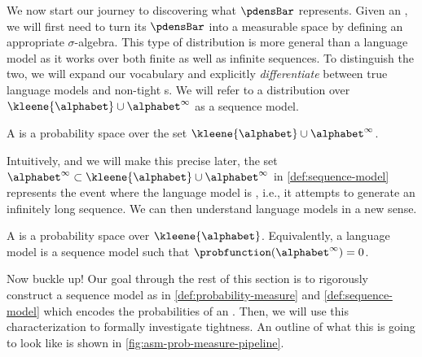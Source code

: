 We now start our journey to discovering what $\pdensBar$ represents.
Given an \autoregmodelAcronym, we will first need to turn its $\pdensBar$ into a measurable space by defining an appropriate $\sigma$-algebra.  
This type of distribution is more general than a language model as it works over both finite as well as infinite sequences.
To distinguish the two, we will expand our vocabulary and explicitly \emph{differentiate} between true language models and non-tight \autoregmodelAcronym{}s.
We will refer to a distribution over $\kleene{\alphabet} \cup \alphabet^\infty$ as a sequence model.  
\begin{definition}
\label{def:sequence-model}
A  is a probability space over the set $\kleene{\alphabet} \cup \alphabet^\infty$.
\end{definition}
Intuitively, and we will make this precise later, the set $\alphabet^\infty\subset\kleene{\alphabet} \cup \alphabet^\infty$ in \cref{def:sequence-model} represents the event where the language model is , i.e., it attempts to generate an infinitely long sequence. 
We can then understand language models in a new sense.
\begin{definition}
\label{def:language-model-eqivalent}
A  is a probability space over $\kleene{\alphabet}$.
Equivalently, a language model is a sequence model such that $\probfunction(\alphabet^\infty)=0$.
\end{definition}
Now buckle up!
Our goal through the rest of this section is to rigorously construct a sequence model as in \cref{def:probability-measure} and \cref{def:sequence-model} which encodes the probabilities of an \autoregmodelAcronym. 
Then, we will use this characterization to formally investigate tightness.
An outline of what this is going to look like is shown in \cref{fig:asm-prob-measure-pipeline}.
